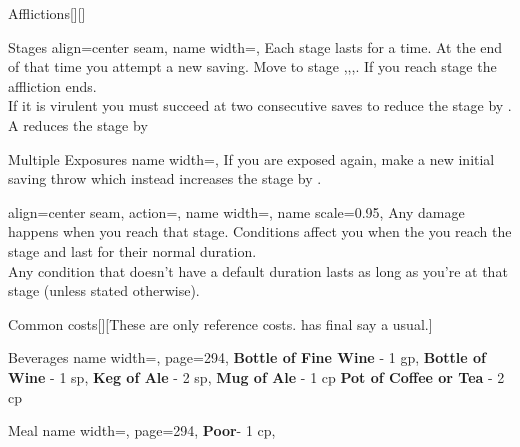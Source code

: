 \begin{PageBack}
\begin{Tables}{\backTableHeight}
\begin{Table}{Afflictions}[][]
\begin{entry}{Stages}{%
                align=center seam,
                name width=\turnLength,}
                Each stage lasts for a time. At the end of that time you attempt a new saving.
                Move to stage ,,,.
                If you reach stage  the affliction ends.\\
                If it is virulent you must succeed at two consecutive saves to reduce the stage by .
                A  reduces the stage by 
            \end{entry}
            \begin{entry}{Multiple Exposures}{%
                name width=\turnLength,}
                If you are exposed again, make a new initial saving throw which instead
                increases the stage by  .
            \end{entry}
            \begin{entry}{}{%
                align=center seam,
                action={\BodyFont{}},
                name width=\turnLength,%
                name scale=0.95,
            }
                Any damage happens when you reach that stage.
                Conditions affect you when the you reach the stage and last for their normal duration.\\
                Any condition that doesn't have a default duration lasts as long as you're at that stage (unless stated otherwise).
            \end{entry}
        \end{Table}\TableSpace
        \begin{Table}{Common costs}[][These are only reference costs. \GM has final say a usual.]
            \begin{entry}{Beverages }{%
                name width=\turnLength,%
                page=294,
            }
                \textbf{Bottle of Fine Wine} - 1 gp, \quad
                \textbf{Bottle of Wine} - 1 sp, \quad
                \textbf{Keg of Ale} - 2 sp, \quad
                \textbf{Mug of Ale} - 1 cp \quad
                \textbf{Pot of Coffee or Tea} - 2 cp\quad
            \end{entry}
            \begin{entry}{Meal}{%
                name width=\turnLength,%
                page=294,
            }
                \textbf{Poor}- 1 cp, \quad

\end{entry}
\end{Table}
\end{Tables}
\end{PageBack}
